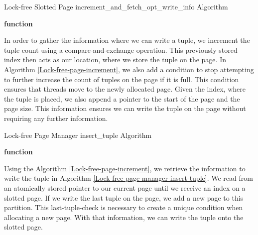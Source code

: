 \begin{algorithm}[h]
  \caption{Lock-free Slotted Page increment\_and\_fetch\_opt\_write\_info Algorithm}\label{Lock-free-page-increment}
  \textbf{function}
\end{algorithm}
In order to gather the information where we can write a tuple, we increment the tuple count using a compare-and-exchange operation.
This previously stored index then acts as our location, where we store the tuple on the page.
In Algorithm \ref{Lock-free-page-increment}, we also add a condition to stop attempting to further increase the count of tuples on the page if it is full.
This condition ensures that threads move to the newly allocated page.
Given the index, where the tuple is placed, we also append a pointer to the start of the page and the page size.
This information ensures we can write the tuple on the page without requiring any further information.

\begin{algorithm}[h]
  \caption{Lock-free Page Manager insert\_tuple Algorithm}\label{Lock-free-page-manager-insert-tuple}
  \textbf{function} \end{algorithm} Using the Algorithm \ref{Lock-free-page-increment}, we retrieve the information to write the tuple in Algorithm \ref{Lock-free-page-manager-insert-tuple}.
We read from an atomically stored pointer to our current page until we receive an index on a slotted page.
If we write the last tuple on the page, we add a new page to this partition.
This last-tuple-check is necessary to create a unique condition when allocating a new page.
With that information, we can write the tuple onto the slotted page.
